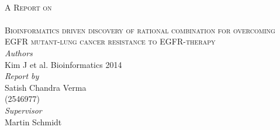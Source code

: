 \begin{titlepage}
\\[2.0cm]





\textsc{A Report on \\\HRule\\[0.2cm] \Large{Bioinformatics driven discovery of rational combination for overcoming EGFR mutant-lung cancer resistance to EGFR-therapy}} \HRule\\[2.0cm]






\emph{Authors}\\
Kim J et al. Bioinformatics 2014\\[1.0cm]
\emph{Report by}\\
Satish Chandra Verma \\(2546977) \\[1.0cm]
\emph{Supervisor}\\
Martin Schmidt \\
\end{titlepage}